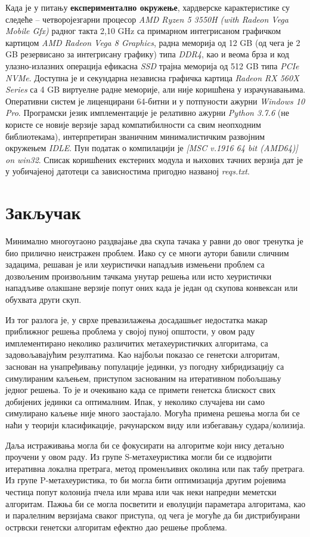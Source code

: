 \documentclass[a4paper]{article}
\begin{document}
Када је у питању \textbf{експериментално окружење}, хардверске карактеристике су следеће -- четворојезгарни процесор \textit{AMD Ryzen 5 3550H (with Radeon Vega Mobile Gfx)} радног такта 2,10 GHz са примарном интегрисаном графичком картицом \textit{AMD Radeon Vega 8 Graphics}, радна меморија од 12 GB (од чега је 2 GB резервисано за интегрисану графику) типа \textit{DDR4}, као и веома брза и код улазно-излазних операција ефикасна \textit{SSD} трајна меморија од 512 GB типа \textit{PCIe NVMe}. Доступна је и секундарна независна графичка картица \textit{Radeon RX 560X Series} са 4 GB виртуелне радне меморије, али није коришћена у израчунавањима. Оперативни систем је лиценцирани 64-битни и у потпуности ажурни \textit{Windows 10 Pro}. Програмски језик имплементације је релативно ажурни \textit{Python 3.7.6} (не користе се новије верзије зарад компатибилности са свим неопходним библиотекама), интерпретиран званичним минималистичким развојним окружењем \textit{IDLE}. Пун податак о компилацији је \textit{[MSC v.1916 64 bit (AMD64)] on win32}. Списак коришћених екстерних модула и њихових тачних верзија дат је у уобичајеној датотеци са зависностима пригодно названој \textit{reqs.txt}.

\section{Закључак}

Минимално многоугаоно раздвајање два скупа тачака у равни до овог тренутка је био прилично неистражен проблем. Иако су се многи аутори бавили сличним задацима, решаван је или хеуристички нападљив измењени проблем са дозвољеним произвољним тачкама унутар решења или исто хеуристички нападљиве олакшане верзије попут оних када је један од скупова конвексан или обухвата други скуп.

Из тог разлога је, у сврхе превазилажења досадашњег недостатка макар приближног решења проблема у својој пуној општости, у овом раду имплементирано неколико различитих метахеуристичких алгоритама, са задовољавајућим резултатима. Као најбољи показао се генетски алгоритам, заснован на унапређивању популације јединки, уз погодну хибридизацију са симулираним каљењем, приступом заснованим на итеративном побољшању једног решења. То је и очекивано када се примети генетска блискост свих добијених јединки са оптималним. Ипак, у неколико случајева ни само симулирано каљење није много заостајало. Могућа примена решења могла би се наћи у теорији класификације, рачунарском виду или избегавању судара/колизија.

Даља истраживања могла би се фокусирати на алгоритме који нису детаљно проучени у овом раду. Из групе S-метахеуристика могли би се издвојити итеративна локална претрага, метод променљивих околина или пак табу претрага. Из групе P-метахеуристика, то би могла бити оптимизација другим ројевима честица попут колонија пчела или мрава или чак неки напредни меметски алгоритам. Пажња би се могла посветити и еволуцији параметара алгоритама, као и паралелним верзијама сваког приступа, од чега је могуће да би дистрибуирани острвски генетски алгоритам ефектно дао решење проблема.

\newpage
{}
\appendix


\end{document}
